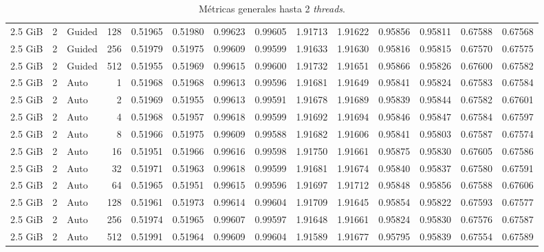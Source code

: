 \begin{table}[H]
\begin{adjustbox}{width=\textwidth, keepaspectratio}
\begin{tabular}{rrlrrrrrrrrrrr}
                    2.5 GiB & 2 & Guided & 128 & 0.51965 & 0.51980 & 0.99623 & 0.99605 & 1.91713 & 1.91622 & 0.95856 & 0.95811 & 0.67588 & 0.67568 \\
                    2.5 GiB & 2 & Guided & 256 & 0.51979 & 0.51975 & 0.99609 & 0.99599 & 1.91633 & 1.91630 & 0.95816 & 0.95815 & 0.67570 & 0.67575 \\
                    2.5 GiB & 2 & Guided & 512 & 0.51955 & 0.51969 & 0.99615 & 0.99600 & 1.91732 & 1.91651 & 0.95866 & 0.95826 & 0.67600 & 0.67582 \\
                    2.5 GiB & 2 & Auto & 1 & 0.51968 & 0.51968 & 0.99613 & 0.99596 & 1.91681 & 1.91649 & 0.95841 & 0.95824 & 0.67583 & 0.67584 \\
                    2.5 GiB & 2 & Auto & 2 & 0.51969 & 0.51955 & 0.99613 & 0.99591 & 1.91678 & 1.91689 & 0.95839 & 0.95844 & 0.67582 & 0.67601 \\
                    2.5 GiB & 2 & Auto & 4 & 0.51968 & 0.51957 & 0.99618 & 0.99599 & 1.91692 & 1.91694 & 0.95846 & 0.95847 & 0.67584 & 0.67597 \\
                    2.5 GiB & 2 & Auto & 8 & 0.51966 & 0.51975 & 0.99609 & 0.99588 & 1.91682 & 1.91606 & 0.95841 & 0.95803 & 0.67587 & 0.67574 \\
                    2.5 GiB & 2 & Auto & 16 & 0.51951 & 0.51966 & 0.99616 & 0.99598 & 1.91750 & 1.91661 & 0.95875 & 0.95830 & 0.67605 & 0.67586 \\
                    2.5 GiB & 2 & Auto & 32 & 0.51971 & 0.51963 & 0.99618 & 0.99599 & 1.91681 & 1.91674 & 0.95840 & 0.95837 & 0.67580 & 0.67591 \\
                    2.5 GiB & 2 & Auto & 64 & 0.51965 & 0.51951 & 0.99615 & 0.99596 & 1.91697 & 1.91712 & 0.95848 & 0.95856 & 0.67588 & 0.67606 \\
                    2.5 GiB & 2 & Auto & 128 & 0.51961 & 0.51973 & 0.99614 & 0.99604 & 1.91709 & 1.91645 & 0.95854 & 0.95822 & 0.67593 & 0.67577 \\
                    2.5 GiB & 2 & Auto & 256 & 0.51974 & 0.51965 & 0.99607 & 0.99597 & 1.91648 & 1.91661 & 0.95824 & 0.95830 & 0.67576 & 0.67587 \\
                    2.5 GiB & 2 & Auto & 512 & 0.51991 & 0.51964 & 0.99609 & 0.99604 & 1.91589 & 1.91677 & 0.95795 & 0.95839 & 0.67554 & 0.67589 \\
                    \bottomrule
                \end{tabular}
            \end{adjustbox}
            \caption{Métricas generales hasta 2 \textit{threads}.}
            \label{tab:distance_metrics_1}
        \end{table}

